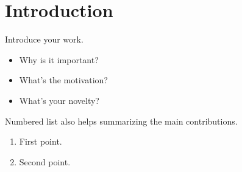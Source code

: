 \section{Introduction}
\label{sec:intro}

Introduce your work. 
\begin{itemize}
\item Why is it important? 
\item What's the motivation?
\item What's your novelty?
\end{itemize}

Numbered list also helps summarizing the main contributions.
\begin{enumerate}
\item First point.
\item Second point.
\end{enumerate}